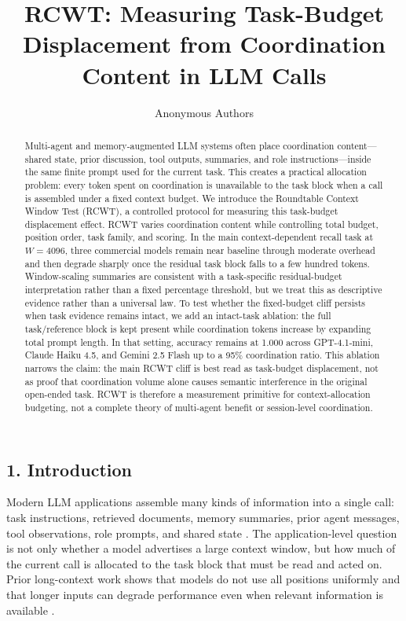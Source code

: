 \documentclass[
  runningheads]{llncs}
\title{RCWT: Measuring Task-Budget Displacement from Coordination
Content in LLM Calls}
\author{Anonymous Authors}
\date{}
\begin{document}
\maketitle

\begin{abstract}
Multi-agent and memory-augmented LLM systems often place coordination content---shared state, prior discussion, tool outputs, summaries, and role instructions---inside the same finite prompt used for the current task. This creates a practical allocation problem: every token spent on coordination is unavailable to the task block when a call is assembled under a fixed context budget. We introduce the Roundtable Context Window Test (RCWT), a controlled protocol for measuring this task-budget displacement effect. RCWT varies coordination content while controlling total budget, position order, task family, and scoring. In the main context-dependent recall task at $W=4096$, three commercial models remain near baseline through moderate overhead and then degrade sharply once the residual task block falls to a few hundred tokens. Window-scaling summaries are consistent with a task-specific residual-budget interpretation rather than a fixed percentage threshold, but we treat this as descriptive evidence rather than a universal law. To test whether the fixed-budget cliff persists when task evidence remains intact, we add an intact-task ablation: the full task/reference block is kept present while coordination tokens increase by expanding total prompt length. In that setting, accuracy remains at 1.000 across GPT-4.1-mini, Claude Haiku 4.5, and Gemini 2.5 Flash up to a 95\% coordination ratio. This ablation narrows the claim: the main RCWT cliff is best read as task-budget displacement, not as proof that coordination volume alone causes semantic interference in the original open-ended task. RCWT is therefore a measurement primitive for context-allocation budgeting, not a complete theory of multi-agent benefit or session-level coordination.
\end{abstract}

\subsection{1. Introduction}\label{introduction}

Modern LLM applications assemble many kinds of information into a single
call: task instructions, retrieved documents, memory summaries, prior
agent messages, tool observations, role prompts, and shared state
\cite{ram-etal-2023-context,toolformer,autogen,guo2024multiagents}. The
application-level question is not only whether a model advertises a
large context window, but how much of the current call is allocated to
the task block that must be read and acted on. Prior long-context work
shows that models do not use all positions uniformly and that longer
inputs can degrade performance even when relevant information is
available \cite{lostmiddle,longbench,ruler,du2025contextlength}.
\end{document}
